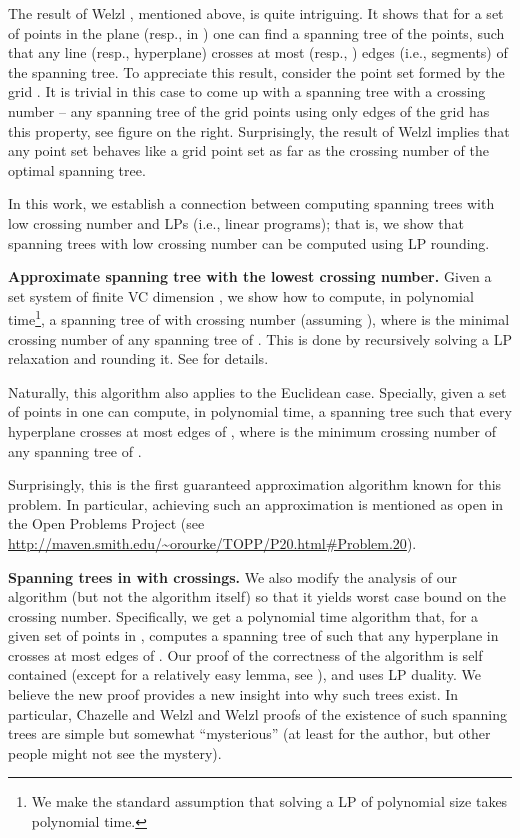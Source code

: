 \documentclass[12pt]{article}
\newcommand{\Term}[1]{\textsf{#1}}
\newcommand{\LP}{\Term{L{}P}\xspace}
\newcommand{\VC}{\Term{V{C}}\xspace}
\begin{document}

The result of Welzl \cite{w-stlcn-92}, mentioned above, is quite
intriguing. It shows that for a set  of  points in the
plane (resp., in ) one can find a spanning tree of the points,
such that any line (resp., hyperplane) crosses at most 
(resp., ) edges (i.e., segments) of the spanning tree.
To appreciate this result, consider the point set formed by the grid
. It is trivial in this case to come up with
a spanning tree with a crossing number  -- any spanning
tree of the grid points using only edges of the grid has this
property, see figure on the right. Surprisingly, the result of Welzl
\cite{w-stlcn-92} implies that any point set behaves like a grid point
set as far as the crossing number of the optimal spanning tree.


\bigskip In this work, we establish a connection between computing
spanning trees with low crossing number and \LP{}s (i.e., linear
programs); that is, we show that spanning trees with low crossing
number can be computed using \LP rounding.


\medskip
\noindent
\textbf{Approximate spanning tree with the lowest crossing number.}
Given a set system  of finite \VC dimension
, we show how to compute, in polynomial time\footnote{We make the standard assumption that solving a \LP of
   polynomial size takes polynomial time.}, a spanning tree of  with crossing number 
(assuming ), where  is the minimal crossing
number of any spanning tree of .  This is done by recursively
solving a \LP relaxation and rounding it.  See 
for details.




Naturally, this algorithm also applies to the Euclidean case.
Specially, given a set  of  points in  one can
compute, in polynomial time, a spanning tree  such that every
hyperplane crosses at most  edges of , where  is
the minimum crossing number of any spanning tree of .  

Surprisingly, this is the first guaranteed approximation algorithm
known for this problem. In particular, achieving such an approximation
is mentioned as open in the Open Problems Project (see
\url{http://maven.smith.edu/~orourke/TOPP/P20.html#Problem.20}).




\medskip
\noindent
\textbf{Spanning trees in  with  crossings.}  We
also modify the analysis of our algorithm (but not the algorithm
itself) so that it yields worst case bound on the crossing number.
Specifically, we get a polynomial time algorithm that, for a given set
 of  points in , computes a spanning tree  of
 such that any hyperplane in  crosses at most
 edges of .  Our proof of the correctness of the
algorithm is self contained (except for a relatively easy lemma, see
), and uses \LP duality. We believe the new
proof provides a new insight into why such trees exist. In particular,
Chazelle and Welzl \cite{cw-qorss-89} and Welzl \cite{w-stlcn-92}
proofs of the existence of such spanning trees are simple but somewhat
``mysterious'' (at least for the author, but other people might not
see the mystery).
\end{document}
